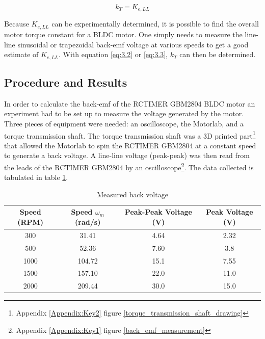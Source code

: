 \begin{equation} \label{eq:3.3}
k_T = K_{e,LL}
\end{equation}

Because \(K_{e,LL}\) can be experimentally determined, it is possible to find the overall motor torque constant for a BLDC motor. One simply needs to measure the line-line sinusoidal or trapezoidal back-emf voltage at various speeds to get a good estimate of \(K_{e,LL}\). With equation \ref{eq:3.2} or \ref{eq:3.3}, \(k_T\) can then be determined.

\subsection{Procedure and Results}
In order to calculate the back-emf of the RCTIMER GBM2804 BLDC motor an experiment had to be set up to measure the voltage generated by the motor. Three pieces of equipment were needed: an oscilloscope, the Motorlab, and a torque transmission shaft. The torque transmission shaft was a 3D printed part\footnote{Appendix \ref{Appendix:Key2} figure \ref{torque_transmission_shaft_drawing}} that allowed the Motorlab to spin the RCTIMER GBM2804 at a constant speed to generate a back voltage. A line-line voltage (peak-peak) was then read from the leads of the RCTIMER GBM2804 by an oscilloscope\footnote{Appendix \ref{Appendix:Key1} figure \ref{back_emf_measurement}}. The data collected is tabulated in table \ref{table3}.

\begin{table}[ht]
\begin{center}
\caption{Measured back voltage }
\begin{tabular}[c]{|c|c|c|c|}

\hline
\textbf{Speed (RPM)} & \textbf{Speed \(\omega_m\) (rad/s)} & \textbf{Peak-Peak Voltage (V)} & \textbf{Peak Voltage (V)}\\

\hline
300  & 31.41  & 4.64 & 2.32\\

\hline
500 & 52.36 & 7.60 & 3.8\\

\hline
1000 & 104.72 & 15.1 & 7.55\\

\hline
1500 & 157.10 & 22.0 & 11.0\\

\hline
2000 & 209.44 & 30.0 & 15.0\\

\hline
\end{tabular}

\label{table3}
\end{center}
\end{table}

